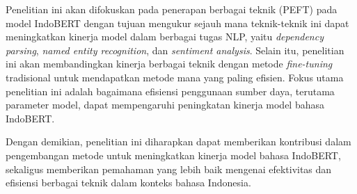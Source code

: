Penelitian ini akan difokuskan pada penerapan berbagai teknik \PEFT (PEFT) pada model IndoBERT dengan tujuan mengukur sejauh mana teknik-teknik ini dapat meningkatkan kinerja model dalam berbagai tugas NLP, yaitu \textit{dependency parsing}, \textit{named entity recognition}, dan \textit{sentiment analysis}. Selain itu, penelitian ini akan membandingkan kinerja berbagai teknik \PEFT dengan metode \textit{fine-tuning} tradisional untuk mendapatkan metode mana yang paling efisien. Fokus utama penelitian ini adalah bagaimana efisiensi penggunaan sumber daya, terutama parameter model, dapat mempengaruhi peningkatan kinerja model bahasa IndoBERT.

Dengan demikian, penelitian ini diharapkan dapat memberikan kontribusi dalam pengembangan metode untuk meningkatkan kinerja model bahasa IndoBERT, sekaligus memberikan pemahaman yang lebih baik mengenai efektivitas dan efisiensi berbagai teknik \PEFT dalam konteks bahasa Indonesia.
